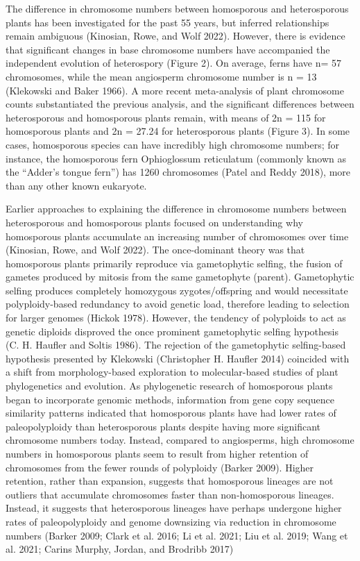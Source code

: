The difference in chromosome numbers between homosporous and heterosporous plants has been investigated for the past 55 years, but inferred relationships remain ambiguous (Kinosian, Rowe, and Wolf 2022). However, there is evidence that significant changes in base chromosome numbers have accompanied the independent evolution of heterospory (Figure 2). On average, ferns have n= 57 chromosomes, while the mean angiosperm chromosome number is n = 13 (Klekowski and Baker 1966). A more recent meta-analysis of plant chromosome counts substantiated the previous analysis, and the significant differences between heterosporous and homosporous plants remain, with means of 2n = 115 for homosporous plants and 2n = 27.24 for heterosporous plants (Figure 3). In some cases, homosporous species can have incredibly high chromosome numbers; for instance, the homosporous fern Ophioglossum reticulatum (commonly known as the “Adder’s tongue fern”) has 1260 chromosomes (Patel and Reddy 2018), more than any other known eukaryote. 

 Earlier approaches to explaining the difference in chromosome numbers between heterosporous and homosporous plants focused on understanding why homosporous plants accumulate an increasing number of chromosomes over time (Kinosian, Rowe, and Wolf 2022). The once-dominant theory was that homosporous plants primarily reproduce via gametophytic selfing, the fusion of gametes produced by mitosis from the same gametophyte (parent). Gametophytic selfing produces completely homozygous zygotes/offspring and would necessitate polyploidy-based redundancy to avoid genetic load, therefore leading to selection for larger genomes (Hickok 1978). However, the tendency of polyploids to act as genetic diploids disproved the once prominent gametophytic selfing hypothesis (C. H. Haufler and Soltis 1986). The rejection of the gametophytic selfing-based hypothesis presented by Klekowski (Christopher H. Haufler 2014) coincided with a shift from morphology-based exploration to molecular-based studies of plant phylogenetics and evolution.
As phylogenetic research of homosporous plants began to incorporate genomic methods, information from gene copy sequence similarity patterns indicated that homosporous plants have had lower rates of paleopolyploidy than heterosporous plants despite having more significant chromosome numbers today. Instead, compared to angiosperms, high chromosome numbers in homosporous plants seem to result from higher retention of chromosomes from the fewer rounds of polyploidy (Barker 2009). Higher retention, rather than expansion, suggests that homosporous lineages are not outliers that accumulate chromosomes faster than non-homosporous lineages. Instead, it suggests that heterosporous lineages have perhaps undergone higher rates of paleopolyploidy and genome downsizing via reduction in chromosome numbers (Barker 2009; Clark et al. 2016; Li et al. 2021; Liu et al. 2019; Wang et al. 2021; Carins Murphy, Jordan, and Brodribb 2017)

